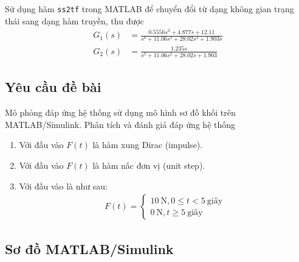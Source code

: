 \documentclass[12pt,a4paper]{article}
\begin{document}
Sử dụng hàm \texttt{ss2tf} trong MATLAB để chuyển đổi từ dạng không gian trạng thái sang dạng hàm truyền, thu được
\begin{align}
    G_1(s) &= \frac{0.5556 s^2 + 4.877 s + 12.11}{s^4 + 11.06 s^3 + 28.02 s^2 + 1.903 s} \\
    G_2(s) &= \frac{1.235s}{s^3 + 11.06 s^2 + 28.02 s + 1.903}
\end{align}

\subsection{Yêu cầu đề bài}
Mô phỏng đáp ứng hệ thống sử dụng mô hình sơ đồ khối trên MATLAB/Simulink. Phân tích 
và đánh giá đáp ứng hệ thống
\begin{enumerate}
    \item Với đầu vào $F(t)$ là hàm xung Dirac (impulse).
    \item Với đầu vào $F(t)$ là hàm nấc đơn vị (unit step). 
    \item Với đầu vào là như sau:
    \begin{align}
        F(t) = \begin{cases}
        10\ \text{N}, 0 \le t < 5\ \text{giây}\\
        0\ \text{N}, t \ge 5\ \text{giây}
    \end{cases} \label{eqn:hxd}
    \end{align}
\end{enumerate}

\subsection{Sơ đồ MATLAB/Simulink}
\end{document}
